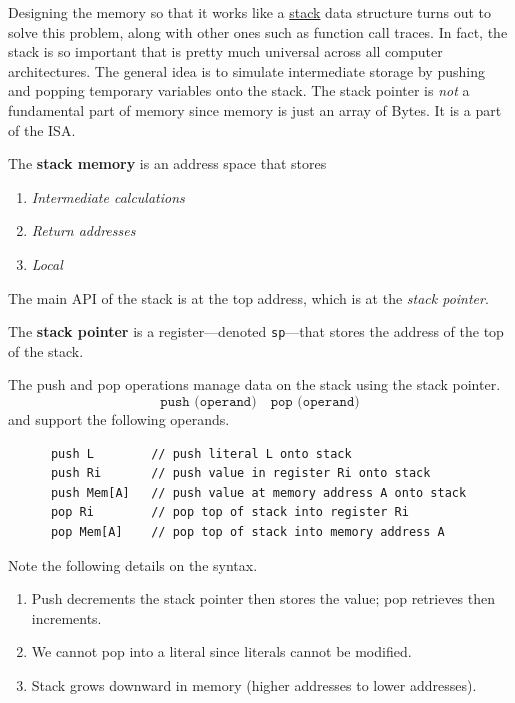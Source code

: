   Designing the memory so that it works like a \hyperref[dsa-def:stack]{stack} data structure turns out to solve this problem, along with other ones such as function call traces. In fact, the stack is so important that is pretty much universal across all computer architectures. The general idea is to simulate intermediate storage by pushing and popping temporary variables onto the stack. The stack pointer is \textit{not} a fundamental part of memory since memory is just an array of Bytes. It is a part of the ISA. 

  \begin{definition}
    The \textbf{stack memory} is an address space that stores 
    \begin{enumerate}
      \item \textit{Intermediate calculations} 
      \item \textit{Return addresses}
      \item \textit{Local }
    \end{enumerate}
  \end{definition}

  The main API of the stack is at the top address, which is at the \textit{stack pointer}. 

  \begin{definition}
    The \textbf{stack pointer} is a register---denoted \texttt{sp}---that stores the address of the top of the stack. 
  \end{definition}

  \begin{definition}
    The push and pop operations manage data on the stack using the stack pointer.
    \begin{equation}
      \texttt{push (operand)} \quad \texttt{pop (operand)}
    \end{equation}
    and support the following operands.
    \begin{lstlisting}
      push L        // push literal L onto stack
      push Ri       // push value in register Ri onto stack
      push Mem[A]   // push value at memory address A onto stack
      pop Ri        // pop top of stack into register Ri
      pop Mem[A]    // pop top of stack into memory address A
    \end{lstlisting}
    Note the following details on the syntax.
    \begin{enumerate}
      \item Push decrements the stack pointer then stores the value; pop retrieves then increments.
      \item We cannot pop into a literal since literals cannot be modified.
      \item Stack grows downward in memory (higher addresses to lower addresses).
    \end{enumerate}
  \end{definition}

